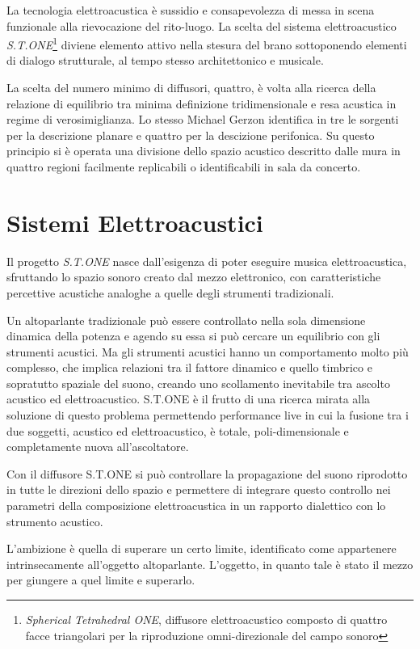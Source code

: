 La tecnologia elettroacustica è sussidio e consapevolezza di messa in scena funzionale alla
rievocazione del rito-luogo. La scelta del sistema elettroacustico \emph{S.T.ONE}\footnote{\emph{Spherical
Tetrahedral ONE}, diffusore elettroacustico composto di quattro facce triangolari per la riproduzione omni-direzionale
del campo sonoro} diviene elemento attivo nella stesura del brano sottoponendo elementi di dialogo strutturale, al tempo stesso
architettonico e musicale.

La scelta del numero minimo di diffusori, quattro, è volta alla ricerca della relazione di equilibrio tra
minima definizione tridimensionale e resa acustica in regime di verosimiglianza. Lo stesso Michael Gerzon
identifica in tre le sorgenti per la descrizione planare e quattro per la descizione perifonica.
Su questo principio si è operata una divisione dello spazio acustico descritto dalle mura in quattro regioni facilmente 
replicabili o identificabili in sala da concerto.

\section{Sistemi Elettroacustici}

Il progetto \emph{S.T.ONE} nasce dall'esigenza di poter eseguire musica elettroacustica,
sfruttando lo spazio sonoro creato dal mezzo elettronico, con caratteristiche percettive
acustiche analoghe a quelle degli strumenti tradizionali.

Un altoparlante tradizionale può essere controllato nella sola dimensione dinamica della
potenza e agendo su essa si può cercare un equilibrio con gli strumenti acustici.
Ma gli strumenti acustici hanno un comportamento molto più complesso, che implica relazioni
tra il fattore dinamico e quello timbrico e sopratutto spaziale del suono, creando uno
scollamento inevitabile tra ascolto acustico ed elettroacustico. S.T.ONE è il frutto di
una ricerca mirata alla soluzione di questo problema permettendo performance live in cui
la fusione tra i due soggetti, acustico ed elettroacustico, è totale, poli-dimensionale e completamente nuova all'ascoltatore. 

Con il diffusore S.T.ONE si può controllare la propagazione del suono riprodotto in tutte
le direzioni dello spazio e permettere di integrare questo controllo nei parametri della
composizione elettroacustica in un rapporto dialettico con lo strumento acustico.

L'ambizione è quella di superare un certo limite, identificato come appartenere intrinsecamente
all'oggetto altoparlante. L'oggetto, in quanto tale è stato il mezzo per giungere a quel limite e superarlo.

